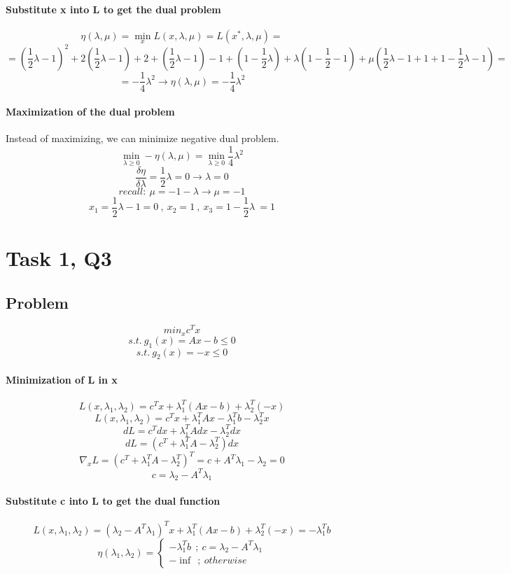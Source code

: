 \documentclass[12pt]{article}
\begin{document}
\paragraph{Substitute x into L to get the dual problem}
\[\eta(\lambda , \mu) = \min_x L(x, \lambda, \mu) = L(x^*, \lambda, \mu) = \]
\[= (\frac{1}{2} \lambda - 1)^2 +2(\frac{1}{2} \lambda - 1)+2+(\frac{1}{2} \lambda - 1)-1+(1 - \frac{1}{2} \lambda)+ \lambda(1 - \frac{1}{2} - 1) + \mu(\frac{1}{2} \lambda - 1 + 1 + 1 - \frac{1}{2} \lambda - 1) = \]
\[= - \frac{1}{4} \lambda ^2 \longrightarrow \eta(\lambda , \mu) = - \frac{1}{4} \lambda ^2\]
\paragraph{Maximization of the dual problem}
Instead of maximizing, we can minimize negative dual problem.
\[ \min_{\lambda \geq 0} -\eta(\lambda , \mu) = \min_{\lambda \geq 0} \frac{1}{4} \lambda ^2\]
\[\frac{\delta \eta}{\delta \lambda} = \frac{1}{2} \lambda = 0 \longrightarrow \lambda=0 \]
\[recall: \ \mu = -1 - \lambda \longrightarrow \mu = -1\]
\[x_1 = \frac{1}{2} \lambda -1 = 0 \ , \ x_2 =1 \ , \ x_3 = 1 - \frac{1}{2} \lambda\ = 1\]

\newpage
\section{Task 1, Q3}
\subsection{Problem}
\[min_x c^T x\]
\[s.t. \ g_1 (x) = Ax-b \leq 0 \]
\[s.t. \ g_2 (x) = -x \leq 0 \]

\paragraph{Minimization of L in x}
\[L(x,\lambda_1, \lambda_2) = c^T x + \lambda_1 ^T (Ax-b) + \lambda_2 ^T (-x)\]
\[L(x,\lambda_1, \lambda_2) = c^T x + \lambda_1 ^T Ax - \lambda_1 ^T b - \lambda_2 ^T x\]
\[dL = c^T dx + \lambda_1 ^T A dx - \lambda_2 ^ T dx \]
\[dL = (c^T + \lambda_1 ^T A - \lambda_2 ^T)dx \]
\[\nabla_x L = (c^T + \lambda_1 ^T A - \lambda_2 ^T)^T = c+A^T \lambda_1 - \lambda_2 =0\]
\[c=\lambda_2 - A^T \lambda_1\]
\paragraph{Substitute c into L to get the dual function}
\[L(x,\lambda_1, \lambda_2) = (\lambda_2 - A^T \lambda_1)^T x + \lambda_1 ^T (Ax-b) + \lambda_2 ^T (-x) = -\lambda_1 ^T b\]
  \[
    \eta(\lambda_1 , \lambda_2) =\left\{
                \begin{array}{ll}
                  -\lambda_1 ^T b \ \ ; \ c=\lambda_2 - A^T \lambda_1 \\
                  - \inf \ \ ; \ otherwise
                \end{array}
              \right.
  \]
\end{document}
